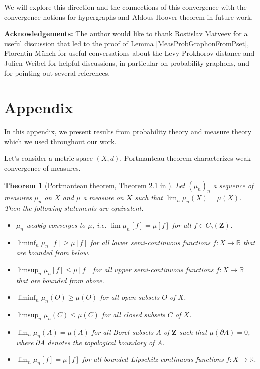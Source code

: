\documentclass[11pt]{article}
\newtheorem{theorem}{Theorem}[section]
\newcommand{\Space}{\mathbf{Z}}
\newcommand{\CbFunct}{C_b(\Space)}
\begin{document}
We will explore this direction and the connections of this convergence with the convergence notions for hypergraphs \cite{hypergrELEK20121731,HypergraphonsZhao,zucal2023action} and Aldous-Hoover theorem \cite{aldous1981representations,hoover1979relations,austin2008exchangeable,diaconis2007graph} in future work.
\newline



\textbf{Acknowledgements:}  The author would like to thank Rostislav Matveev for a useful discussion that led to the proof of Lemma \ref{MeasProbGraphonFromPset}, Florentin M\"unch for useful conversations about the Levy-Prokhorov distance and Julien Weibel for helpful discussions, in particular on probability graphons, and for pointing out several references.
\medskip

\section*{Appendix}
In this appendix, we present results from probability theory and measure theory which we used throughout our work.

Let's consider a metric space $(X,d).$  Portmanteau theorem characterizes weak convergence of measures.

\begin{theorem}[Portmanteau theorem, Theorem 2.1 in \cite{billingsley1968convergence}]\label{PortThm}
    Let $(\mu_n)_n$ a sequence of measures $\mu_n$ on $X$ and $\mu$ a measure on $X$ such that $\lim_n\mu_n(X)=\mu(X)$. Then the following statements are equivalent.
    \begin{itemize}
        \item $\mu_n$ weakly converges to $\mu$, i.e. $\lim \mu_n[f]=\mu[f]$ for all $f\in \CbFunct$.
        \item $\liminf_n \mu_n[ f]\geq \mu[f] $ for all lower semi-continuous functions $f: X \rightarrow \mathbb{R}$ that are bounded from below.
        \item  $\limsup_n\mu_n[f] \leq  \mu[f]$ for all upper semi-continuous functions $f: X \rightarrow \mathbb{R}$ that are bounded from above.
        \item $\liminf _n \mu_n(O) \geq \mu(O)$ for all open subsets $O$ of $X$.
        \item  $\limsup _n \mu_n(C) \leq \mu(C)$ for all closed subsets $C$ of $X$.
        \item  $\lim _n \mu_n(A)=\mu(A)$ for all Borel subsets $A$ of $\Space$ such that $\mu(\partial A)=0$, where $\partial A$ denotes the topological boundary of $A$.
        \item $\lim _n \mu_n[f]=\mu[f]$ for all bounded Lipschitz-continuous functions $f: X \rightarrow \mathbb{R}$.
    \end{itemize}
\end{theorem}
\end{document}
